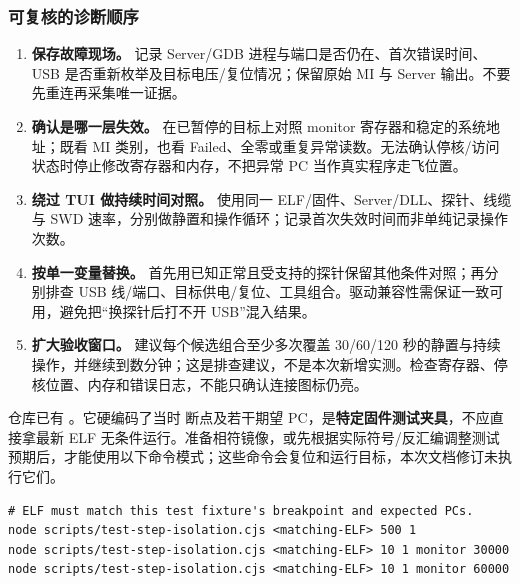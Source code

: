 \documentclass[UTF8,a4paper,11pt,oneside,fontset=none]{ctexart}
\newcommand{\code}[1]{\texttt{\detokenize{#1}}}
\begin{document}
\subsubsection*{可复核的诊断顺序}
\begin{enumerate}
\item \textbf{保存故障现场。} 记录 Server/GDB 进程与端口是否仍在、首次错误时间、USB 是否重新枚举及目标电压/复位情况；保留原始 MI 与 Server 输出。不要先重连再采集唯一证据。
\item \textbf{确认是哪一层失效。} 在已暂停的目标上对照 monitor 寄存器和稳定的系统地址；既看 MI 类别，也看 Failed、全零或重复异常读数。无法确认停核/访问状态时停止修改寄存器和内存，不把异常 PC 当作真实程序走飞位置。
\item \textbf{绕过 TUI 做持续时间对照。} 使用同一 ELF/固件、Server/DLL、探针、线缆与 SWD 速率，分别做静置和操作循环；记录首次失效时间而非单纯记录操作次数。
\item \textbf{按单一变量替换。} 首先用已知正常且受支持的探针保留其他条件对照；再分别排查 USB 线/端口、目标供电/复位、工具组合。驱动兼容性需保证一致可用，避免把“换探针后打不开 USB”混入结果。
\item \textbf{扩大验收窗口。} 建议每个候选组合至少多次覆盖 30/60/120 秒的静置与持续操作，并继续到数分钟；这是排查建议，不是本次新增实测。检查寄存器、停核位置、内存和错误日志，不能只确认连接图标仍亮。
\end{enumerate}

仓库已有 。它硬编码了当时 \code{user_task.c:40} 断点及若干期望 PC，是\textbf{特定固件测试夹具}，不应直接拿最新 ELF 无条件运行。准备相符镜像，或先根据实际符号/反汇编调整测试预期后，才能使用以下命令模式；这些命令会复位和运行目标，本次文档修订未执行它们。
\par\noindent\begin{minipage}{\linewidth}
\begin{lstlisting}
# ELF must match this test fixture's breakpoint and expected PCs.
node scripts/test-step-isolation.cjs <matching-ELF> 500 1
node scripts/test-step-isolation.cjs <matching-ELF> 10 1 monitor 30000
node scripts/test-step-isolation.cjs <matching-ELF> 10 1 monitor 60000
\end{lstlisting}
\end{minipage}\par
\end{document}
